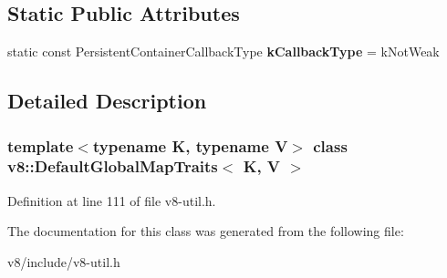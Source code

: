 \subsection*{Static Public Attributes}
\begin{DoxyCompactItemize}
\item 
\mbox{\label{classv8_1_1DefaultGlobalMapTraits_aca4a466a95927f10ea3fa0bff1e041d2}} 
static const Persistent\+Container\+Callback\+Type {\bfseries k\+Callback\+Type} = k\+Not\+Weak
\end{DoxyCompactItemize}


\subsection{Detailed Description}
\subsubsection*{template$<$typename K, typename V$>$\newline
class v8\+::\+Default\+Global\+Map\+Traits$<$ K, V $>$}



Definition at line 111 of file v8-\/util.\+h.



The documentation for this class was generated from the following file\+:\begin{DoxyCompactItemize}
\item 
v8/include/v8-\/util.\+h\end{DoxyCompactItemize}
